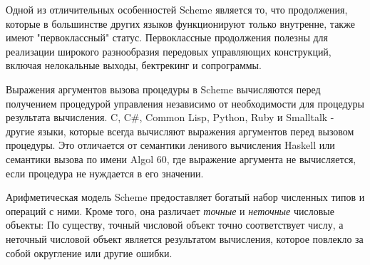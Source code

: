 \vest Одной из отличительных особенностей Scheme является то, что продолжения, которые в
большинстве других языков функционируют только внутренне, также имеют "первоклассный"
статус. Первоклассные продолжения полезны для реализации широкого разнообразия передовых
управляющих конструкций, включая нелокальные выходы, бектрекинг и сопрограммы.

Выражения аргументов вызова процедуры в Scheme вычисляются перед получением процедурой
управления независимо от необходимости для процедуры результата вычисления.
C, C\#, Common Lisp, Python, Ruby и Smalltalk - другие языки, которые всегда вычисляют выражения
аргументов перед вызовом процедуры. Это отличается от семантики ленивого вычисления Haskell или
семантики вызова по имени Algol 60, где выражение аргумента не вычисляется, если процедура не
нуждается в его значении.

Арифметическая модель Scheme предоставляет богатый набор численных типов и операций с
ними. Кроме того, она различает \textit{точные} и \textit{неточные} числовые объекты: По
существу, точный числовой объект точно соответствует числу, а неточный числовой объект является
результатом вычисления, которое повлекло за собой округление или другие ошибки.

